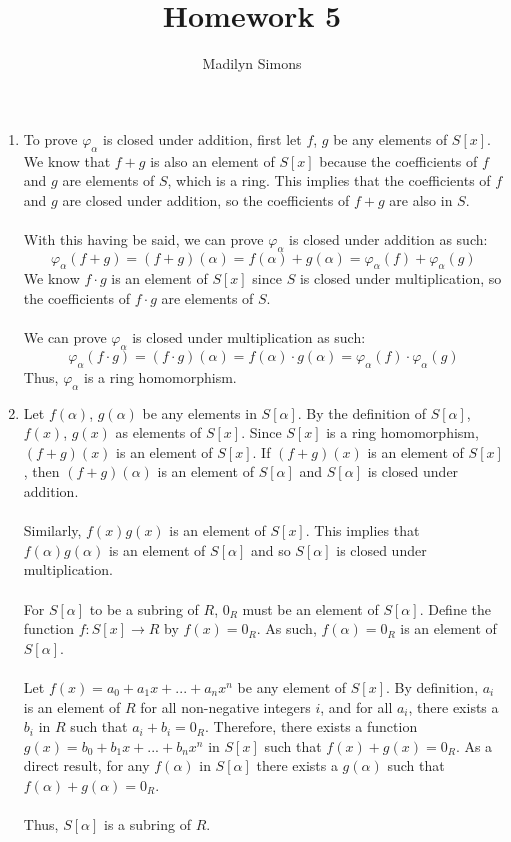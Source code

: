 \documentclass{article}
\title{Homework 5}
\author{Madilyn Simons}
\date{}
\begin{document}
\maketitle

\begin{enumerate}

\item To prove $\varphi_{\alpha}$ is closed under addition, first let $f$, $g$
be any elements of $S[x]$.  We know that $f+g$ is also an element of
$S[x]$ because the coefficients of $f$ and $g$ are elements of $S$, which is a
ring.  This implies that the coefficients of $f$ and $g$ are closed under
addition, so the coefficients of $f+g$ are also in $S$.
\\ \\
With this having be said, we can prove $\varphi_{\alpha}$ is closed under addition
as such:
\[
\varphi_{\alpha}(f+g) = (f+g)(\alpha) = f(\alpha) + g(\alpha)
= \varphi_{\alpha}(f) + \varphi_{\alpha}(g)
\]
We know $f \cdot g$ is an element of $S[x]$ since $S$ is closed under multiplication,
so the coefficients of $f \cdot g$ are elements of $S$.
\\ \\
We can prove $\varphi_{\alpha}$ is closed under multiplication as such:
\[
\varphi_{\alpha}(f \cdot g) = (f \cdot g)(\alpha) = f(\alpha) \cdot g(\alpha)
= \varphi_{\alpha}(f) \cdot \varphi_{\alpha}(g)
\]
Thus, $\varphi_{\alpha}$ is a ring homomorphism.

\item Let $f(\alpha)$, $g(\alpha)$ be any elements in $S[\alpha]$.  By the
definition of $S[\alpha]$, $f(x)$, $g(x)$ as elements of $S[x]$.  Since $S[x]$
is a ring homomorphism, $(f+g)(x)$ is an element of $S[x]$.  If $(f+g)(x)$ is an
element of $S[x]$, then $(f+g)(\alpha)$ is an element of $S[\alpha]$ and
$S[\alpha]$ is closed under addition.
\\
\\
Similarly, $f(x)g(x)$ is an element of $S[x]$.  This implies that
$f(\alpha)g(\alpha)$ is an element of $S[\alpha]$ and so $S[\alpha]$ is
closed under multiplication.
\\
\\
For $S[\alpha]$ to be a subring of $R$, $0_R$ must be an element of $S[\alpha]$.
Define the function $f:S[x] \rightarrow R$ by $f(x) = 0_R$.  As such,
$f(\alpha) = 0_R$ is an element of $S[\alpha]$.
\\
\\
Let $f(x) = a_0 + a_{1}x + ... + a_{n}x^n$ be any element of $S[x]$.
By definition, $a_i$ is an element of $R$ for all non-negative integers $i$, and
for all $a_i$, there exists a $b_i$ in $R$ such that $a_i + b_i = 0_R$.
Therefore, there exists a function $g(x) = b_0 + b_{1}x + ... + b_{n}x^n$ in
$S[x]$ such that $f(x) + g(x) = 0_R$.  As a direct result, for any $f(\alpha)$
in $S[\alpha]$ there exists a $g(\alpha)$ such that
$f(\alpha) + g(\alpha) = 0_R$.
\\
\\
Thus, $S[\alpha]$ is a subring of $R$.


\end{enumerate}
\end{document}
